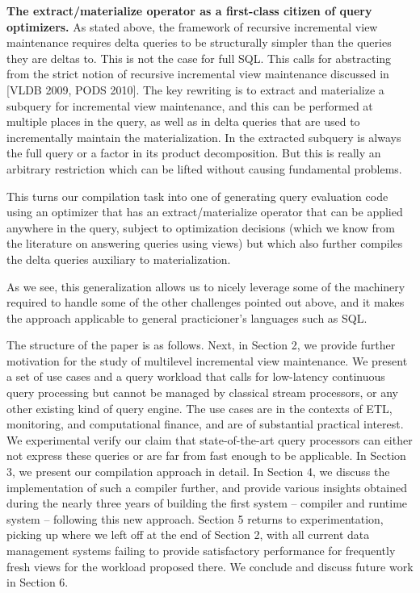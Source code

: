 {\bf The extract/materialize operator as a first-class citizen of query optimizers.}
%
As stated above, the framework of recursive incremental view maintenance requires delta queries to be structurally simpler than the queries they are deltas to. This is not the case for full SQL. This calls for abstracting from the strict notion of recursive incremental view maintenance discussed in [VLDB 2009, PODS 2010]. The key rewriting is to extract and materialize a subquery for incremental view maintenance, and this can be performed at multiple places in the query, as well as in delta queries that are used to incrementally maintain the materialization. In \cite{ahmad-vldb:09, koch-pods:10} the extracted subquery is always the full query or a factor in its product decomposition. But this is really an arbitrary restriction which can be lifted without causing fundamental problems.

This turns our compilation task into one of generating query evaluation code using an optimizer that has an extract/materialize operator that can be applied anywhere in the query, subject to optimization decisions (which we know from the literature on answering queries using views) but which also further compiles the delta queries auxiliary to materialization.

As we see, this generalization allows us to nicely leverage some of the machinery required to handle some of the other challenges pointed out above, and it makes the approach applicable to general practicioner's languages such as SQL.


\medskip

The structure of the paper is as follows. Next, in Section 2, we provide further motivation for the study of multilevel incremental view maintenance. We present a set of use cases and a query workload that calls for low-latency continuous query processing but cannot be managed by classical stream processors, or any other existing kind of query engine. The use cases are in the contexts of ETL, monitoring, and computational finance, and are of substantial practical interest. We experimental verify our claim that state-of-the-art query processors can either not express these queries or are far from fast enough to be applicable.
In Section 3, we present our compilation approach in detail. In Section 4, we discuss the implementation of such a compiler further, and provide various insights obtained during the nearly three years of building the first system -- compiler and runtime system -- following this new approach.
Section 5 returns to experimentation, picking up where we left off at the end of Section 2, with all current data management systems failing to provide satisfactory performance for frequently fresh views for the workload proposed there.
We conclude and discuss future work in Section 6.

